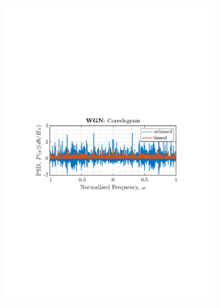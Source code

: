 \documentclass[12pt]{article}
\numberwithin{equation}{section}
\begin{document}
\begin{figure}[H]
\begin{subfigure}{0.49\textwidth}
			\includegraphics[trim={2.2cm 11cm 3.15cm  11.2cm}, clip, width=\textwidth]{../MATLAB/figures/q1_3a_fig01.pdf} 
		\end{subfigure}
		\begin{subfigure}{0.49\textwidth}
			\centering

\end{subfigure}
\end{figure}
\end{document}
